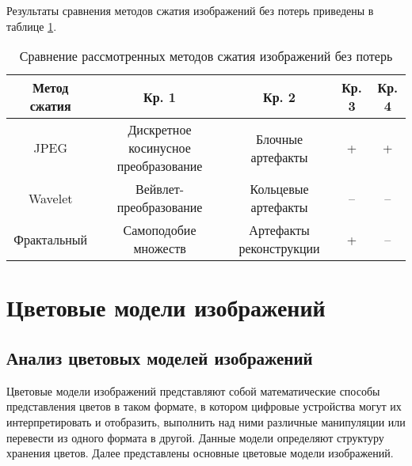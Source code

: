 Результаты сравнения методов сжатия изображений без потерь приведены в таблице \ref{tbl:compare_realizations2}.
\begin{table}[H]
    \centering
	\caption{Сравнение рассмотренных методов сжатия изображений без потерь}
    \label{tbl:compare_realizations2}
	\begin{tabular}{|c|c|c|c|c|}
        \hline
        \textbf{Метод сжатия} & \textbf{Кр. 1} & \textbf{Кр. 2} & \textbf{Кр. 3} & \textbf{Кр. 4}
        \\ \hline
        JPEG        & \begin{minipage}[t]{5.5cm}\centering Дискретное косинусное \newline преобразование \end{minipage} & \begin{minipage}[t]{3.1cm}\centering Блочные \newline артефакты \newline \end{minipage} & + & + \\ \hline
        Wavelet     & Вейвлет-преобразование & \begin{minipage}[t]{3.1cm}\centering Кольцевые \newline артефакты \newline \end{minipage}     & -- & --  \\ \hline 
        Фрактальный & Самоподобие множеств   & \begin{minipage}[t]{3.1cm}\centering Артефакты \newline реконструкции \newline \end{minipage} & +  & -- \\ \hline
    \end{tabular}
\end{table}

\section{Цветовые модели изображений}

\subsection{Анализ цветовых моделей изображений}

Цветовые модели изображений представляют собой математические способы представления цветов в таком формате, в котором цифровые устройства могут их интерпретировать и отобразить, выполнить над ними различные манипуляции или перевести из одного формата в другой. Данные модели определяют структуру хранения цветов. Далее представлены основные цветовые модели изображений.

